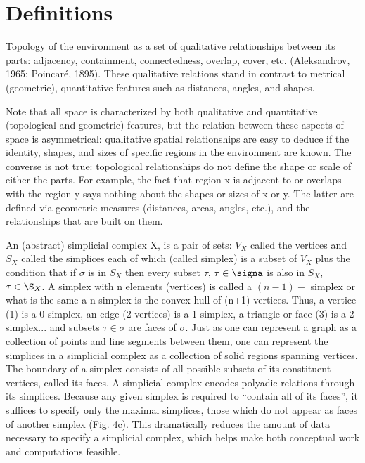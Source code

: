 \documentclass[onecollarge,runningheads]{svjour2}
\begin{document}
\section*{Definitions}
Topology of the environment as a set of qualitative relationships between its parts: adjacency, containment, connectedness, overlap, cover, etc. (Aleksandrov, 1965; Poincaré, 1895). 
These qualitative relations stand in contrast to metrical (geometric), quantitative features such as distances, angles, and shapes.

Note that all space is characterized by both qualitative and quantitative (topological and geometric) features, but the relation between these aspects of space is asymmetrical: qualitative spatial relationships are easy to deduce if the identity, shapes, and sizes of specific regions in the environment are known. 
The converse is not true: topological relationships do not define the shape or scale of either the parts. For example, the fact that region x is adjacent to or overlaps with the region y says nothing about the shapes or sizes of x or y. The latter are defined via geometric measures (distances, areas, angles, etc.), and the relationships that are built on them.

An (abstract) simplicial complex X, is a pair of sets: $V_X$ called the vertices and $S_X$ called the simplices each of which (called simplex) is a subset of $V_X$ plus the condition that if $\sigma$ is in $S_X$ then every subset $\tau$, $\tau \in \signa$ is also in $S_X$, $\tau \in \S_X$.
A simplex with n elements (vertices) is called a $(n-1)-$ simplex or what is the same a n-simplex is the convex hull of (n+1) vertices. Thus, a vertice (1) is a 0-simplex, an edge (2 vertices) is a 1-simplex, a triangle or face (3) is a 2-simplex... and subsets $\tau \in \sigma$ are faces of $\sigma$. Just as one can represent a graph as a collection of points and line segments between them, one can represent the simplices in a simplicial complex as a collection of solid regions spanning vertices.
The boundary of a simplex consists of all possible subsets of its constituent vertices, called its faces. 
A simplicial complex encodes polyadic relations through its simplices.
Because any given simplex is required to “contain all of its faces”, it suffices to specify only the maximal simplices, those which do not appear as faces of another simplex (Fig. 4c). This dramatically reduces the amount of data necessary to specify a simplicial complex, which helps make both conceptual work and computations feasible.
\end{document}
